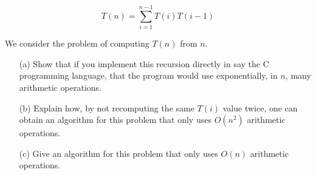\documentclass[10pt]{article}
\begin{document}
	\[T(n) = \sum\limits_{i=1}^{n-1} T(i)T(i-1) \]
	
	\noindent
	We consider the problem of computing $T(n)$ from $n$.
	\begin{enumerate}
		\item[(a)] 	Show that if you implement this recursion directly in say the C programming language, that the
								program would use exponentially, in $n$, many arithmetic operations.
		\item[(b)] 	Explain how, by not recomputing the same $T(i)$ value twice, one can obtain an algorithm for this
								problem that only uses $O(n^2)$ arithmetic operations.
		\item[(c)]	Give an algorithm for this problem that only uses $O(n)$ arithmetic operations.
	\end{enumerate}
\end{document}
